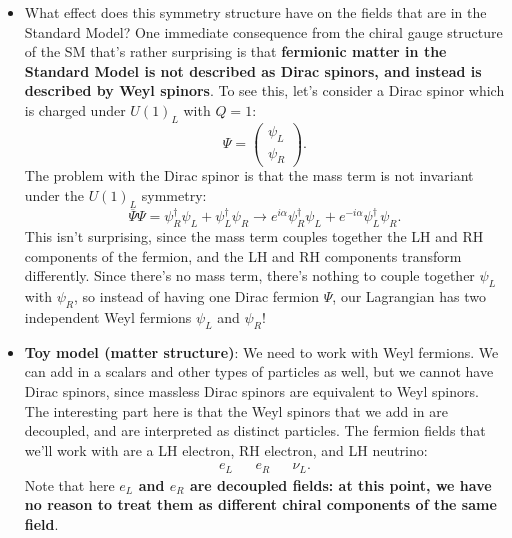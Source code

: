 \documentclass[12pt, oneside]{article}   	%
\theoremstyle{definition}
\begin{document}
\begin{itemize}
	\item What effect does this symmetry structure have on the fields that are in the Standard Model? One immediate consequence from the chiral gauge structure of the SM that's rather surprising is that \textbf{fermionic matter in the Standard Model is not described as Dirac spinors, and instead is described by Weyl spinors}. To see this, let's consider a Dirac spinor which is charged under $U(1)_L$ with $Q = 1$:
	\begin{equation}
		\Psi = \begin{pmatrix} \psi_L \\ \psi_R \end{pmatrix}.
	\end{equation}
	The problem with the Dirac spinor is that the mass term is not invariant under the $U(1)_L$ symmetry:
	\begin{equation}
		\overline\Psi\Psi = \psi_R^\dagger\psi_L + \psi_L^\dagger \psi_R \rightarrow e^{i\alpha} \psi_R^\dagger\psi_L + e^{-i\alpha} \psi_L^\dagger \psi_R.
	\end{equation}
	This isn't surprising, since the mass term couples together the LH and RH components of the fermion, and the LH and RH components transform differently. Since there's no mass term, there's nothing to couple together $\psi_L$ with $\psi_R$, so instead of having one Dirac fermion $\Psi$, our Lagrangian has two independent Weyl fermions $\psi_L$ and $\psi_R$!
	
	\item \textbf{Toy model (matter structure)}: We need to work with Weyl fermions. We can add in a scalars and other types of particles as well, but we cannot have Dirac spinors, since massless Dirac spinors are equivalent to Weyl spinors. The interesting part here is that the Weyl spinors that we add in are decoupled, and are interpreted as distinct particles. The fermion fields that we'll work with are a LH electron, RH electron, and LH neutrino:
	\begin{align}
		e_L && e_R && \nu_L.
	\end{align}
	Note that here \textbf{$e_L$ and $e_R$ are decoupled fields: at this point, we have no reason to treat them as different chiral components of the same field}. 
	

\end{itemize}
\end{document}
